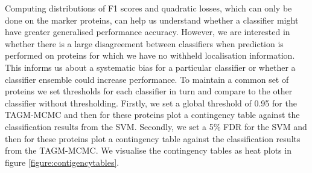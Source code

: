 \documentclass[12pt,english]{article}\usepackage[]{graphicx}\usepackage[]{color}
\begin{document}
\clearpage

Computing distributions of F1 scores and quadratic losses, which can
only be done on the marker proteins, can help us understand whether a
classifier might have greater generalised performance
accuracy. However, we are interested in whether there is a large
disagreement between classifiers when prediction is performed on
proteins for which we have no withheld localisation information. This
informs us about a systematic bias for a particular classifier or
whether a classifier ensemble could increase performance. To maintain
a common set of proteins we set thresholds for each classifier in turn
and compare to the other classifier without thresholding. Firstly, we
set a global threshold of 0.95 for the TAGM-MCMC and then for these
proteins plot a contingency table against the classification results
from the SVM. Secondly, we set a 5\% FDR for the SVM and then for
these proteins plot a contingency table against the classification
results from the TAGM-MCMC. We visualise the contingency tables as
heat plots in figure \ref{figure:contigencytables}.
\end{document}
